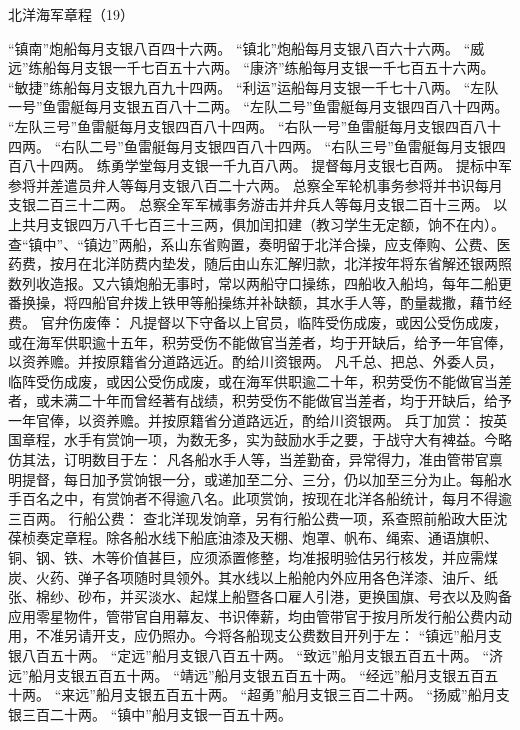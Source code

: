 \documentclass[12pt,UTF8]{ctexbook}
\begin{document}
北洋海军章程（19）

“镇南”炮船每月支银八百四十六两。
“镇北”炮船每月支银八百六十六两。
“威远”练船每月支银一千七百五十六两。
“康济”练船每月支银一千七百五十六两。
“敏捷”练船每月支银九百九十四两。
“利运”运船每月支银一千七十八两。
“左队一号”鱼雷艇每月支银五百八十二两。
“左队二号”鱼雷艇每月支银四百八十四两。
“左队三号”鱼雷艇每月支银四百八十四两。
“右队一号”鱼雷艇每月支银四百八十四两。
“右队二号”鱼雷艇每月支银四百八十四两。
“右队三号”鱼雷艇每月支银四百八十四两。
练勇学堂每月支银一千九百八两。
提督每月支银七百两。
提标中军参将并差遣员弁人等每月支银八百二十六两。
总察全军轮机事务参将并书识每月支银二百三十二两。
总察全军军械事务游击并弁兵人等每月支银二百十三两。
以上共月支银四万八千七百三十三两，俱加闰扣建（教习学生无定额，饷不在内）。
查“镇中”、“镇边”两船，系山东省购置，奏明留于北洋合操，应支俸购、公费、医药费，按月在北洋防费内垫发，随后由山东汇解归款，北洋按年将东省解还银两照数列收造报。又六镇炮船无事时，常以两船守口操练，四船收入船坞，每年二船更番换操，将四船官弁拨上铁甲等船操练并补缺额，其水手人等，酌量裁撒，藉节经费。
官弁伤废俸：
凡提督以下守备以上官员，临阵受伤成废，或因公受伤成废，或在海军供职逾十五年，积劳受伤不能做官当差者，均于开缺后，给予一年官俸，以资养赡。并按原籍省分道路远近。酌给川资银两。
凡千总、把总、外委人员，临阵受伤成废，或因公受伤成废，或在海军供职逾二十年，积劳受伤不能做官当差者，或未满二十年而曾经著有战绩，积劳受伤不能做官当差者，均于开缺后，给予一年官俸，以资养赡。并按原籍省分道路远近，酌给川资银两。
兵丁加赏：
按英国章程，水手有赏饷一项，为数无多，实为鼓励水手之要，于战守大有裨益。今略仿其法，订明数目于左：
凡各船水手人等，当差勤奋，异常得力，准由管带官禀明提督，每日加予赏饷银一分，或递加至二分、三分，仍以加至三分为止。每船水手百名之中，有赏饷者不得逾八名。此项赏饷，按现在北洋各船统计，每月不得逾三百两。
行船公费：
查北洋现发饷章，另有行船公费一项，系查照前船政大臣沈葆桢奏定章程。除各船水线下船底油漆及天棚、炮罩、帆布、绳索、通语旗帜、铜、钢、铁、木等价值甚巨，应须添置修整，均准报明验估另行核发，并应需煤炭、火药、弹子各项随时具领外。其水线以上船舱内外应用各色洋漆、油斤、纸张、棉纱、砂布，并买淡水、起煤上船暨各口雇人引港，更换国旗、号衣以及购备应用零星物件，管带官自用幕友、书识俸薪，均由管带官于按月所发行船公费内动用，不准另请开支，应仍照办。今将各船现支公费数目开列于左：
“镇远”船月支银八百五十两。
“定远”船月支银八百五十两。
“致远”船月支银五百五十两。
“济远”船月支银五百五十两。
“靖远”船月支银五百五十两。
“经远”船月支银五百五十两。
“来远”船月支银五百五十两。
“超勇”船月支银三百二十两。
“扬威”船月支银三百二十两。
“镇中”船月支银一百五十两。
\end{document}
